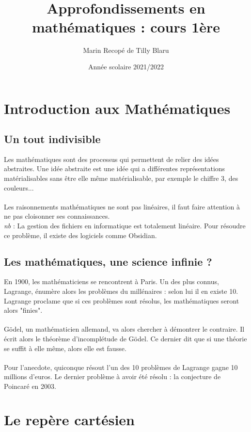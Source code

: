 \documentclass{report}
\title{Approfondissements en mathématiques : cours 1ère}
\author{Marin Recopé de Tilly Blaru}
\date{Année scolaire 2021/2022}
\begin{document}
\maketitle

\vspace{5mm}

\tableofcontents

\newpage

\chapter{Introduction aux Mathématiques}

\section{Un tout indivisible}
Les mathématiques sont des processus qui permettent de relier des idées abstraites. Une idée abstraite est une idée qui a différentes représentations matérialisables sans être elle même matérialisable, par exemple le chiffre 3, des couleurs... \\ \\
Les raisonnements mathématiques ne sont pas linéaires, il faut faire attention à ne pas cloisonner ses connaissances. \\
\emph{nb} : La gestion des fichiers en informatique est totalement linéaire. Pour résoudre ce problème, il existe des logiciels comme Obsidian.

\section{Les mathématiques, une science infinie ?}
En 1900, les mathématiciens se rencontrent à Paris. Un des plus connus, Lagrange, énumère alors les problèmes du millénaires : selon lui il en existe 10. Lagrange proclame que si ces problèmes sont résolus, les mathématiques seront alors "finies".  \\ \\
Gödel, un mathématicien allemand, va alors chercher à démontrer le contraire. Il écrit alors le théorème d'incomplétude de Gödel. Ce dernier dit que si une théorie se suffit à elle même, alors elle est fausse. \\ \\
Pour l'anecdote, quiconque résout l'un des 10 problèmes de Lagrange gagne 10 millions d'euros. Le dernier problème à avoir été résolu : la conjecture de Poincaré en 2003.


\chapter{Le repère cartésien}
\end{document}
